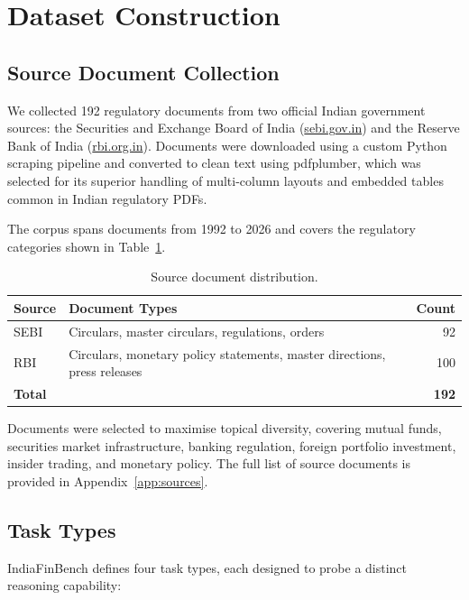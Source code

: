 \documentclass[11pt]{article}
\begin{document}
\section{Dataset Construction}

\subsection{Source Document Collection}

We collected 192 regulatory documents from two official Indian government
sources: the Securities and Exchange Board of India (\url{sebi.gov.in}) and the
Reserve Bank of India (\url{rbi.org.in}). Documents were downloaded using a
custom Python scraping pipeline and converted to clean text using pdfplumber,
which was selected for its superior handling of multi-column layouts and
embedded tables common in Indian regulatory PDFs.

The corpus spans documents from 1992 to 2026 and covers the regulatory
categories shown in Table~\ref{tab:sources}.

\begin{table}[h]
\centering
\caption{Source document distribution.}
\label{tab:sources}
\begin{tabular}{llr}
\toprule
\textbf{Source} & \textbf{Document Types} & \textbf{Count} \\
\midrule
SEBI & Circulars, master circulars, regulations, orders & 92 \\
RBI  & Circulars, monetary policy statements, master directions, press releases & 100 \\
\midrule
\textbf{Total} & & \textbf{192} \\
\bottomrule
\end{tabular}
\end{table}

Documents were selected to maximise topical diversity, covering mutual funds,
securities market infrastructure, banking regulation, foreign portfolio
investment, insider trading, and monetary policy. The full list of source
documents is provided in Appendix~\ref{app:sources}.

\subsection{Task Types}

IndiaFinBench defines four task types, each designed to probe a distinct
reasoning capability:
\end{document}
